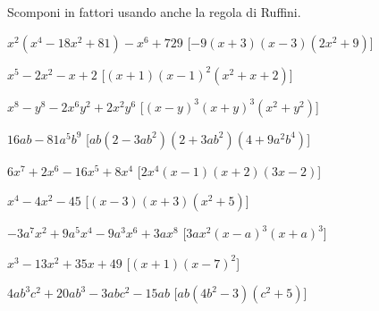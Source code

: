 

\begin{esercizio}[\Ast]
 \label{ese:17.24}
 Scomponi in fattori usando anche la regola di Ruffini.
 \begin{enumeratea}
  \item $x^{2}(x^{4}-18x^{2}+81)-x^{6}+729$
  \hfill [$-9(x+3)(x-3)(2x^{2}+9)$]
\item $x^{5}-2x^{2}-x+2$
  \hfill [$(x+1)(x-1)^{2}(x^{2}+x+2)$]
\item $x^{8}-y^{8}-2x^{6}y^{2}+2x^{2}y^{6}$
  \hfill [$(x-y)^{3}(x+y)^{3}(x^{2}+y^{2})$]
\item $16ab-81a^{5}b^{9}$
  \hfill [${ab}(2-3{ab}^{2})(2+3{ab}^{2})(4+9a^{2}b^{4})$]
\item $6x^{7}+2x^{6}-16x^{5}+8x^{4}$
  \hfill [$2x^{4}(x-1)(x+2)(3x-2)$]
\item $x^{4}-4x^{2}-45$
  \hfill [$(x-3)(x+3)(x^{2}+5)$]
\item $-3a^{7}x^{2}+9a^{5}x^{4}-9a^{3}x^{6}+3ax^{8}$
  \hfill [$3ax^{2}(x-a)^{3}(x+a)^{3}$]
\item $x^{3}-13x^{2}+35x+49$
  \hfill [$(x+1)(x-7)^{2}$]
\item $4ab^{3}c^{2}+20ab^{3}-3abc^{2}-15ab$
  \hfill [${ab}(4b^{2}-3)(c^{2}+5)$]
 \end{enumeratea}
\end{esercizio}

